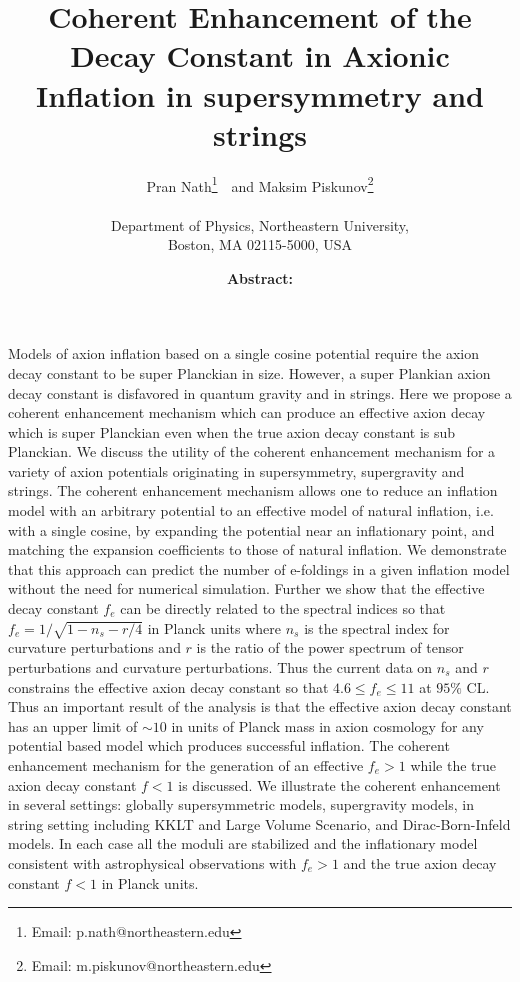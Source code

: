 \documentclass[12pt]{article}
\author{
  Pran Nath\footnote{Email: p.nath@northeastern.edu}~\ and
  Maksim Piskunov\footnote{Email: m.piskunov@northeastern.edu}\\~\\
  Department of Physics, Northeastern University,\\
  Boston, MA 02115-5000, USA
}
\title{
  Coherent Enhancement of the Decay Constant
  in Axionic Inflation in supersymmetry and strings
}
\begin{document}
\maketitle
\date

\textbf{Abstract:}
Models of axion inflation based on a single cosine potential require the axion decay constant to be super Planckian in size.
However, a super Plankian axion decay constant is disfavored in quantum gravity and in strings.
Here we propose a coherent enhancement mechanism which can produce an effective axion decay which is super Planckian even when the true axion decay constant is sub Planckian.
We discuss the utility of the coherent enhancement mechanism for a variety of axion potentials originating in supersymmetry, supergravity and strings.
The coherent enhancement mechanism allows one to reduce an inflation model with an arbitrary potential to an effective model of natural inflation, i.e. with a single cosine, by expanding the potential near an inflationary point, and matching the expansion coefficients to those of natural inflation.
We demonstrate that this approach can predict the number of e-foldings in a given inflation model without the need for numerical simulation.
Further we show that the effective decay constant $f_e$ can be directly related to the spectral indices so that $f_e = 1 / \sqrt{1 - n_s - r / 4}$ in Planck units where $n_s$ is the spectral index for curvature perturbations and $r$ is the ratio of the power spectrum of tensor perturbations and curvature perturbations.
Thus the current data on $n_s$ and $r$ constrains the effective axion decay constant so that $4.6 \leq f_e \leq 11$ at $95\%$ CL.
Thus an important result of the analysis is that the effective axion decay constant has an upper limit of $\sim 10$ in units of Planck mass in axion cosmology for any potential based model which produces successful inflation.
The coherent enhancement mechanism for the generation of an effective $f_e > 1$ while the true axion decay constant $f < 1$ is discussed.
We illustrate the coherent enhancement in several settings: globally supersymmetric models, supergravity models, in string setting including KKLT and Large Volume Scenario, and Dirac-Born-Infeld models.
In each case all the moduli are stabilized and the inflationary model consistent with astrophysical observations with $f_e > 1$ and the true axion decay constant $f < 1$ in Planck units.
\newpage
\end{document}
